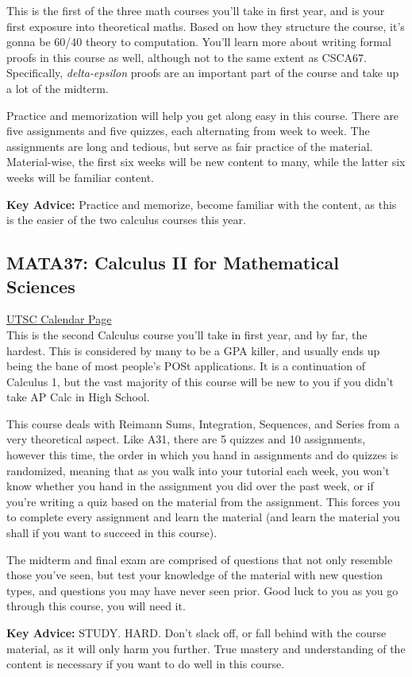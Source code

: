 \documentclass[11pt]{article}
\begin{document}
This is the first of the three math courses you'll take in first year, and is your first exposure into theoretical maths.  Based on how they structure the course, it's gonna be 60/40 theory to computation.  You'll learn more about writing formal proofs in this course as well, although not to the same extent as CSCA67. Specifically, \textit{delta-epsilon} proofs are an important part of the course and take up a lot of the midterm.\par
Practice and memorization will help you get along easy in this course.  There are five assignments and five quizzes, each alternating from week to week.  The assignments are long and tedious, but serve as fair practice of the material.  Material-wise, the first six weeks will be new content to many, while the latter six weeks will be familiar content.\par
\textbf{Key Advice:} Practice and memorize, become familiar with the content, as this is the easier of the two calculus courses this year.

\subsection{MATA37: Calculus II for Mathematical Sciences}

\href{https://utsc.calendar.utoronto.ca/course/MATA37H3}{UTSC Calendar Page}\\

This is the second Calculus course you'll take in first year, and by far, the hardest.  This is considered by many to be a GPA killer, and usually ends up being the bane of most people's POSt applications. It is a continuation of Calculus 1, but the vast majority of this course will be new to you if you didn't take AP Calc in High School.\par
This course deals with Reimann Sums, Integration, Sequences, and Series from a very theoretical aspect.  Like A31, there are 5 quizzes and 10 assignments, however this time, the order in which you hand in assignments and do quizzes is randomized, meaning that as you walk into your tutorial each week, you won't know whether you hand in the assignment you did over the past week, or if you're writing a quiz based on the material from the assignment.  This forces you to complete every assignment and learn the material (and learn the material you shall if you want to succeed in this course). \par
The midterm and final exam are comprised of questions that not only resemble those you've seen, but test your knowledge of the material with new question types, and questions you may have never seen prior.  Good luck to you as you go through this course, you will need it.\par
\textbf{Key Advice:} STUDY. HARD. Don't slack off, or fall behind with the course material, as it will only harm you further.  True mastery and understanding of the content is necessary if you want to do well in this course.
\end{document}
